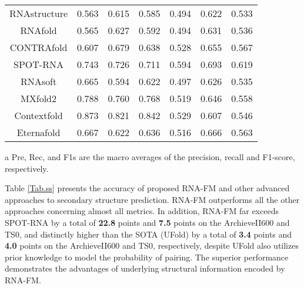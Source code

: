 \begin{table}[t]
\begin{threeparttable}
\begin{tabular}{ccccccc}
RNAstructure                & 0.563 & 0.615 & 0.585                   & 0.494 & 0.622 & 0.533                 \\
RNAfold                     & 0.565 & 0.627 & 0.592                   & 0.494 & 0.631 & 0.536                 \\
CONTRAfold                  & 0.607 & 0.679 & 0.638                   & 0.528 & 0.655 & 0.567                 \\
SPOT-RNA                    & 0.743 & 0.726 & 0.711 
& 0.594 & 0.693 & 0.619                 \\
RNAsoft	                    & 0.665 & 0.594 & 0.622
 & 0.497 & 0.626 & 0.535                 \\
MXfold2	                    & 0.788 & 0.760 & 0.768
 & 0.519 & 0.646 & 0.558                 \\
Contextfold	                & 0.873 & 0.821 & 0.842 	
 & 0.529 & 0.607 & 0.546                 \\
Eternafold	                & 0.667 & 0.622 & 0.636 	
 & 0.516 & 0.666 & 0.563                 \\

\bottomrule
\end{tabular}
\begin{tablenotes}
        \footnotesize
        \item[a] Pre, Rec, and F1s are the macro averages of the precision, recall and F1-score, respectively.  %
      \end{tablenotes}
\end{threeparttable}
\end{table}



Table \ref{Tab.ss} presents the accuracy of proposed RNA-FM and other advanced approaches \cite{fu2021ufold, huang2019linearfold,zuker2003mfold, reuter2010rnastructure,chen2020rna,singh2019rna,do2006contrafold,sato2021rna,lorenz2011viennarna,zakov2011rich,andronescu2003rnasoft, wayment2020rna} to secondary structure prediction.
RNA-FM outperforms all the other approaches concerning almost all metrics. In addition, RNA-FM far exceeds SPOT-RNA by a total of \textbf{22.8} points and \textbf{7.5} points on the ArchieveII600 and TS0, and distinctly higher than the SOTA (UFold) by a total of \textbf{3.4} points and \textbf{4.0} points on the ArchieveII600 and TS0, respectively, despite UFold also utilizes prior knowledge to model the probability of pairing. The superior performance demonstrates the advantages of underlying structural information encoded by RNA-FM.




